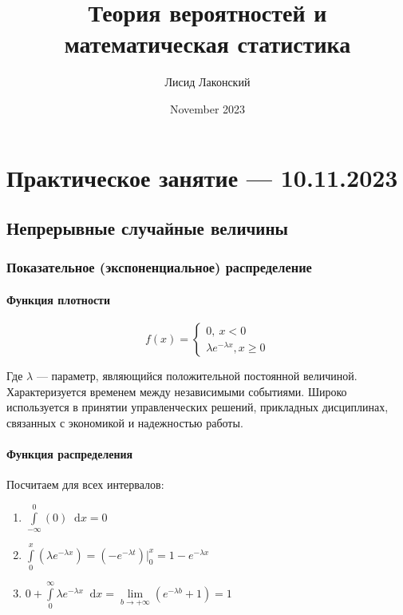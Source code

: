 \documentclass{article}
\title{Теория вероятностей и математическая статистика}
\author{Лисид Лаконский}
\date{November 2023}
\newcommand*\diff{\mathop{}\!\mathrm{d}}
\begin{document}
\raggedright

\maketitle

\tableofcontents
\pagebreak

\section{Практическое занятие — 10.11.2023}

\subsection{Непрерывные случайные величины}

\subsubsection{Показательное (экспоненциальное) распределение}

\paragraph{Функция плотности}

$$
f(x) = \begin{cases}
    0, \ x < 0 \\
    \lambda e^{-\lambda x}, x \ge 0
\end{cases}
$$

Где $\lambda$ — параметр, являющийся положительной постоянной величиной. Характеризуется временем между независимыми событиями. Широко используется в принятии управленческих решений, прикладных дисциплинах, связанных с экономикой и надежностью работы.

\paragraph{Функция распределения}

Посчитаем для всех интервалов:

\begin{enumerate}
    \item $\int\limits_{-\infty}^{0} (0) \diff x = 0$
    \item $\int\limits_{0}^{x} (\lambda e^{-\lambda x}) = (-e^{-\lambda t}) \bigg|_{0}^{x} = 1 - e^{-\lambda x}$
    \item $0 + \int\limits_{0}^{\infty} \lambda e^{-\lambda x} \diff x = \lim\limits_{b \to +\infty} (e^{-\lambda b} + 1) = 1$
\end{enumerate}
\end{document}
